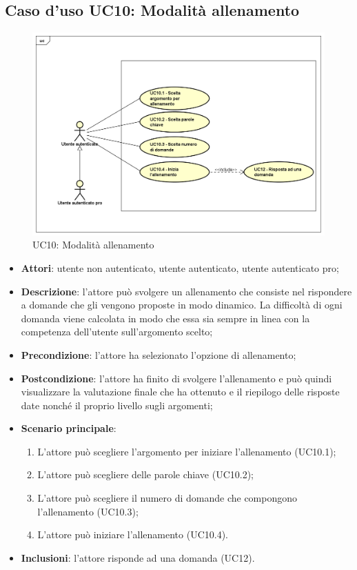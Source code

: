 \newpage
\subsection{Caso d'uso UC10: Modalità allenamento}
\label{UC10}
	\begin{figure}[ht]
	\centering
	\includegraphics[scale=0.5]{UML/UC10.png}
	\caption{UC10: Modalità allenamento}
	\end{figure}
\FloatBarrier
\begin{itemize}
\item\textbf{Attori}: utente non autenticato, utente autenticato, utente autenticato pro;
\item\textbf{Descrizione}: l'attore può svolgere un allenamento che consiste nel rispondere a domande che gli vengono proposte in modo dinamico. La difficoltà di ogni domanda viene calcolata in modo che essa sia sempre in linea con la competenza dell'utente sull'argomento scelto;
\item\textbf{Precondizione}: l'attore ha selezionato l'opzione di allenamento;
\item\textbf{Postcondizione}: l'attore ha finito di svolgere l'allenamento e può quindi visualizzare la valutazione finale che ha ottenuto e il riepilogo delle risposte date nonché il proprio livello sugli argomenti;
\item\textbf{Scenario principale}:
	\begin{enumerate}
		\item L'attore può scegliere l'argomento per iniziare l'allenamento (UC10.1);
		\item L'attore può scegliere delle parole chiave (UC10.2);
		\item L'attore può scegliere il numero di domande che compongono l'allenamento (UC10.3);
		\item L'attore può iniziare l'allenamento (UC10.4).
	\end{enumerate}
\item \textbf{Inclusioni}: l'attore risponde ad una domanda (UC12).
\end{itemize}


